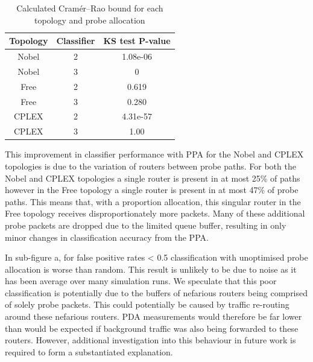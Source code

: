 \begin{table}[H]
 \centering
  \begin{tabular}{@{}ccc@{}}
   \toprule
    Topology & Classifier & KS test P-value \\
    \midrule
    Nobel & 2 & 1.08e-06\\
    Nobel & 3 & 0\\
    Free  & 2 & 0.619\\
    Free  & 3 & 0.280\\
    CPLEX & 2 & 4.31e-57\\
    CPLEX & 3 & 1.00\\
   \bottomrule
  \end{tabular}
  \caption{Calculated Cramér–Rao bound for each topology and probe allocation}
  \label{tbl:Roptkstest}
\end{table}
This improvement in classifier performance with PPA for the Nobel and CPLEX topologies is due to the variation of routers between probe paths. For both the Nobel and CPLEX topologies a single router is present in at most 25\% of paths however in the Free topology a single router is present in at most 47\% of probe paths. This means that, with a proportion allocation, this singular router in the Free topology receives disproportionately more packets. Many of these additional probe packets are dropped due to the limited queue buffer, resulting in only minor changes in classification accuracy from the PPA.\par
In sub-figure a, for false positive rates < 0.5 classification with unoptimised probe allocation is worse than random. This result is unlikely to be due to noise as it has been average over many simulation runs. We speculate that this poor classification is potentially due to the buffers of nefarious routers being comprised of solely probe packets. This could potentially be caused by traffic re-routing around these nefarious routers. PDA measurements would therefore be far lower than would be expected if background traffic was also being forwarded to these routers. However, additional investigation into this behaviour in future work is required to form a substantiated explanation.

